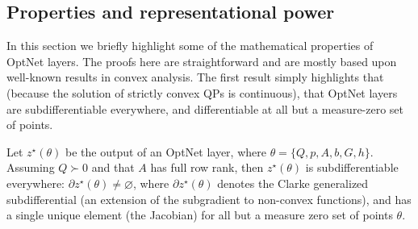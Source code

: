 \subsection{Properties and representational power}
\label{sec:optnet:rep-power}
In this section we briefly highlight some of the mathematical properties of
OptNet layers.  The proofs here are straightforward and are mostly based upon
well-known results in convex analysis.  The
first result simply highlights that (because the solution of
strictly convex QPs is continuous), that OptNet layers are subdifferentiable
everywhere, and differentiable at all but a measure-zero set of points.

\begin{theorem}
    \label{theorem:existence}
    Let $z^\star(\theta)$ be the output of an OptNet layer, where $\theta =
        \{Q,p,A,b,G,h\}$.  Assuming $Q \succ 0$ and that $A$ has full row rank, then
    $z^\star(\theta)$ is subdifferentiable
    everywhere: $\partial z^\star(\theta) \neq \varnothing$, where $\partial
        z^\star(\theta)$ denotes the Clarke generalized subdifferential
    \citep{clarke1975generalized} (an extension of the subgradient to non-convex
    functions), and has a single unique element (the Jacobian) for all but a
    measure zero set of points $\theta$.
\end{theorem}

